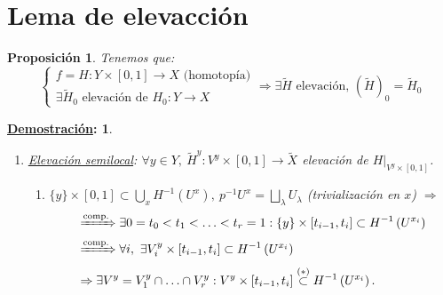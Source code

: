 \documentclass[10pt,a4paper,openright]{book}
\theoremstyle{break}
\newtheorem*{prop}{Proposición}
\newtheorem*{demo}{\underline{Demostración}:}
\begin{document}
\section{Lema de elevacción}%
\label{sec:lema_de_elevaccion}
\begin{prop}
Tenemos que:
\[
\begin{cases}
    f = H: Y \times \left[ 0, 1 \right] \rightarrow X \text{ (homotopía)} \\
    \exists \tilde{H}_0 \text{ elevación de } H_0: Y \rightarrow X
\end{cases} \Rightarrow \exists \tilde{H} \text{ elevación, } \left( \tilde{H} \right)_0 = \tilde{H}_0
\]
\end{prop}
\begin{demo}
\begin{enumerate}
    \item \underline{Elevación semilocal}: $\forall y \in Y,\ \tilde{H}^y: V^y \times \left[ 0, 1 \right] \rightarrow \tilde{X}$ elevación de $H|_{V^y \times \left[ 0, 1 \right]}$.
    \begin{enumerate}
        \item $\{y\} \times \left[ 0, 1 \right] \subset \bigcup_{x} H^{-1}\left( U^x \right),\ p ^{-1} U^x = \bigsqcup_{\lambda} U_{\lambda}$ (trivialización en $x$) $\Rightarrow$
        \begin{align*}
            &\xRightarrow{\text{comp.}} \exists 0 = t_0 < t_1 < \ldots < t_r = 1: \{y\} \times \left[ t_{i - 1}, t_i \right] \subset H^{-1}\left( U^{x_i} \right)\\
            &\xRightarrow{\text{comp.}} \forall i,\ \exists V_i^y \times \left[ t_{i-1}, t_i \right] \subset H^{-1}\left( U^{x_i} \right)\\
            &\Rightarrow \exists V^y = V_1^y \cap \ldots \cap V_r^y: V^y \times \left[ t_{i - 1}, t_i \right] \stackrel{(*)}{\subset} H^{-1}\left( U^{x_i} \right)
        .\end{align*}


\end{enumerate}
\end{enumerate}
\end{demo}
\end{document}
